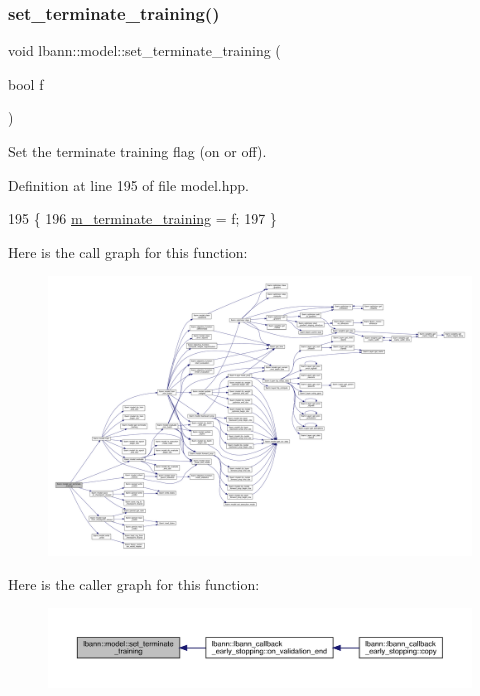 \subsubsection{\texorpdfstring{set\+\_\+terminate\+\_\+training()}{set\_terminate\_training()}}
{\footnotesize\ttfamily void lbann\+::model\+::set\+\_\+terminate\+\_\+training (\begin{DoxyParamCaption}\item[{bool}]{f }\end{DoxyParamCaption})\hspace{0.3cm}{\ttfamily [inline]}}

Set the terminate training flag (on or off). 

Definition at line 195 of file model.\+hpp.


\begin{DoxyCode}
195                                       \{
196     \hyperlink{classlbann_1_1model_a639f9c3fcb81b905085f8b1932f8920f}{m\_terminate\_training} = f;
197   \}
\end{DoxyCode}
Here is the call graph for this function\+:\nopagebreak
\begin{figure}[H]
\begin{center}
\leavevmode
\includegraphics[width=350pt]{classlbann_1_1model_a5bafc4e84671490c6118959becb22e16_cgraph}
\end{center}
\end{figure}
Here is the caller graph for this function\+:\nopagebreak
\begin{figure}[H]
\begin{center}
\leavevmode
\includegraphics[width=350pt]{classlbann_1_1model_a5bafc4e84671490c6118959becb22e16_icgraph}
\end{center}
\end{figure}
\mbox{\label{classlbann_1_1model_afd9dbca79503a40b7aa5c78da4d6f391}} 
